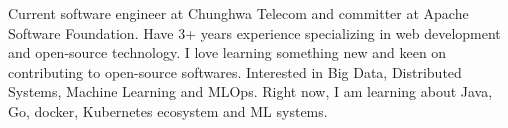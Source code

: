 

\begin{cvparagraph}

Current software engineer at Chunghwa Telecom and committer at Apache Software Foundation. Have 3+ years experience specializing in web development and open-source technology. I love learning something new and keen on contributing to open-source softwares. Interested in Big Data, Distributed Systems, Machine Learning and MLOps. Right now, I am learning about Java, Go, docker, Kubernetes ecosystem and ML systems.
\end{cvparagraph}
